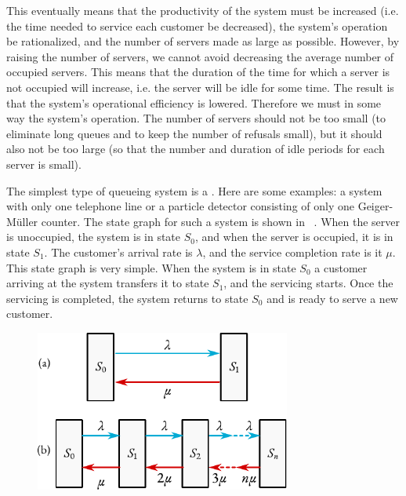 This eventually means that the productivity of the system must be increased (i.e. the time needed to service each customer be decreased), the system's
operation be rationalized, and the number of servers made as large as
possible. However, by raising the number of servers, we cannot avoid
decreasing the average number of occupied servers. This means that the
duration of the time for which a server is not occupied will increase,
i.e. the server will be idle for some time. The result is that the
system's operational efficiency is lowered. Therefore we must in some
way  the system's operation. The number of servers should not
be too small (to eliminate long queues and to keep the number of
refusals small), but it should also not be too large (so that the
number and duration of idle periods for each server is small).

 The simplest type of queueing system is
a . Here are some examples: a system with only one telephone line or a particle detector consisting of only one
Geiger-M\"uller counter. The state graph for such a system is shown in ~. When the server is unoccupied, the system is in state $S_{0}$, and when the server is occupied, it is in state $S_{1}$. The customer’s arrival rate is $\lambda$, and the service completion rate is it $\mu$. This state graph is very simple. When the system is in state $S_{0}$ a customer arriving at the system transfers it to state $S_{1}$, and the servicing starts. Once the servicing is completed, the system returns to state $S_{0}$ and is ready to serve a new customer.
 \begin{figure}[!h]
 \centering
 \includegraphics[width=0.75\textwidth]{figures/state-graph3.pdf}
 \end{figure}

